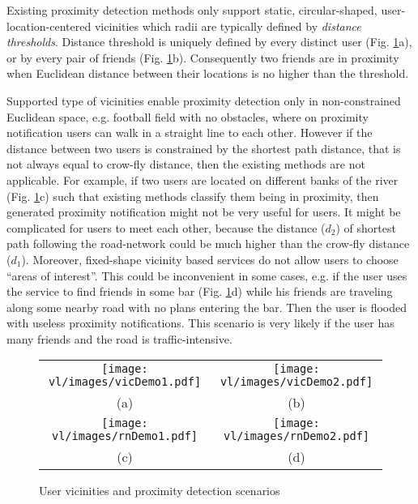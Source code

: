 Existing proximity detection methods only support static, circular-shaped,
user-location-centered vicinities which radii are typically defined by
\textit{distance thresholds}. Distance threshold is uniquely defined by every
distinct user (Fig. \ref{fig:suppVic}a), or by every pair of friends (Fig.
\ref{fig:suppVic}b). Consequently two friends are in proximity when
Euclidean distance between their locations is no higher than the threshold. 


Supported type of vicinities enable proximity detection only in non-constrained
Euclidean space, e.g. football field with no obstacles, where on
proximity notification users can walk in a straight line to each other. However
if the distance between two users is constrained by the shortest path distance,
that is not always equal to crow-fly distance, then the existing methods are not
applicable. For example, if two users are located on different banks of the
river (Fig. \ref{fig:suppVic}c) such that existing methods classify them being
in proximity, then generated proximity notification might not be very useful for
users. It might be complicated for users to meet each other, because the
distance ($d_2$) of shortest path following the road-network could be much
higher than the crow-fly distance ($d_1$). Moreover, fixed-shape vicinity
based services do not allow users to choose ``areas of interest''. This could be
inconvenient in some cases, e.g. if the user uses the service to find
friends in some bar (Fig. \ref{fig:suppVic}d) while his friends are traveling
along some nearby road with no plans entering the bar. Then the user is flooded
with useless proximity notifications. This scenario is very likely if the user
has many friends and the road is traffic-intensive.

\begin{figure}
       \center
       \begin{tabular}{c c}
			   
\texttt{[image: vl/images/vicDemo1.pdf]} &
			   
\texttt{[image: vl/images/vicDemo2.pdf]} \\ 

(a) & (b) \\
			   
\texttt{[image: vl/images/rnDemo1.pdf]} & 
			   
\texttt{[image: vl/images/rnDemo2.pdf]} \\
 (c) & (d)
       \end{tabular}
       \caption{User vicinities and proximity detection scenarios}
            \label{fig:suppVic}
\end{figure}

